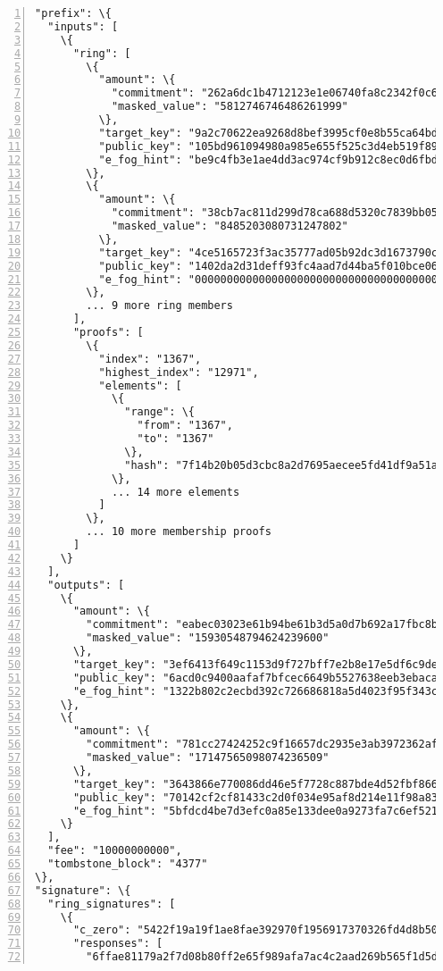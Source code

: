 \begin{appendices}
\begin{Verbatim}[commandchars=\\\{\}, numbers=left]
"prefix": \{
  "inputs": [
    \{
      "ring": [
        \{
          "amount": \{
            "commitment": "262a6dc1b4712123e1e06740fa8c2342f0c6[...]41d3a5286f",
            "masked_value": "5812746746486261999"
          \},
          "target_key": "9a2c70622ea9268d8bef3995cf0e8b55ca64bd[...]bf6e264f19",
          "public_key": "105bd961094980a985e655f525c3d4eb519f89[...]e6e88caa21",
          "e_fog_hint": "be9c4fb3e1ae4dd3ac974cf9b912c8ec0d6fbd[...]90ac970100"
        \},
        \{
          "amount": \{
            "commitment": "38cb7ac811d299d78ca688d5320c7839bb05[...]831e27d162",
            "masked_value": "8485203080731247802"
          \},
          "target_key": "4ce5165723f3ac35777ad05b92dc3d1673790c[...]40ed7d5827",
          "public_key": "1402da2d31deff93fc4aad7d44ba5f010bce06[...]c7f4018d65",
          "e_fog_hint": "00000000000000000000000000000000000000[...]0000000000"
        \},
        ... 9 more ring members
      ],
      "proofs": [
        \{
          "index": "1367",
          "highest_index": "12971",
          "elements": [
            \{
              "range": \{
                "from": "1367",
                "to": "1367"
              \},
              "hash": "7f14b20b05d3cbc8a2d7695aecee5fd41df9a51a[...]e27402d7cf"
            \},
            ... 14 more elements
          ]
        \},
        ... 10 more membership proofs
      ]
    \}
  ],
  "outputs": [
    \{
      "amount": \{
        "commitment": "eabec03023e61b94be61b3d5a0d7b692a17fbc8b[...]c1f8bf0b67",
        "masked_value": "15930548794624239600"
      \},
      "target_key": "3ef6413f649c1153d9f727bff7e2b8e17e5df6c9de[...]f90f7f1b3d",
      "public_key": "6acd0c9400aafaf7bfcec6649b5527638eeb3ebaca[...]ad3ebb3c05",
      "e_fog_hint": "1322b802c2ecbd392c726686818a5d4023f95f343c[...]a496cdfafb"
    \},
    \{
      "amount": \{
        "commitment": "781cc27424252c9f16657dc2935e3ab3972362af[...]4508d38db0",
        "masked_value": "17147565098074236509"
      \},
      "target_key": "3643866e770086dd46e5f7728c887bde4d52fbf866[...]8d3dae341e",
      "public_key": "70142cf2cf81433c2d0f034e95af8d214e11f98a83[...]e52a7ff5f1",
      "e_fog_hint": "5bfdcd4be7d3efc0a85e133dee0a9273fa7c6ef521[...]04e9e10101"
    \}
  ],
  "fee": "10000000000",
  "tombstone_block": "4377"
\},
"signature": \{
  "ring_signatures": [
    \{
      "c_zero": "5422f19a19f1ae8fae392970f1956917370326fd4d8b50[...]a9b5238fe7",
      "responses": [
        "6ffae81179a2f7d08b80ff2e65f989afa7ac4c2aad269b565f1d5d8905fb3f0a",

\end{Verbatim}
\end{appendices}
